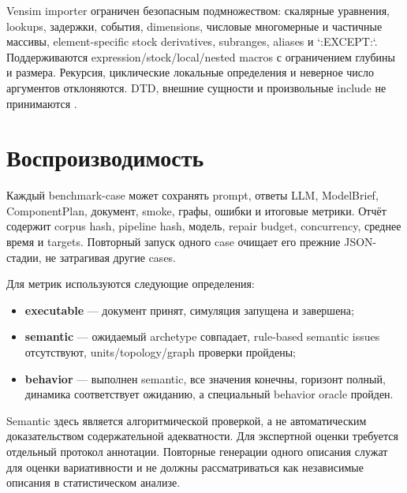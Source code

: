 Vensim importer ограничен безопасным подмножеством: скалярные уравнения, lookups, задержки, события, dimensions, числовые многомерные и частичные массивы, element-specific stock derivatives, subranges, aliases и `:EXCEPT:`. Поддерживаются expression/stock/local/nested macros с ограничением глубины и размера. Рекурсия, циклические локальные определения и неверное число аргументов отклоняются. DTD, внешние сущности и произвольные include не принимаются \cite{vensim2024,xmile2015}.

\section{Воспроизводимость}

Каждый benchmark-case может сохранять prompt, ответы LLM, ModelBrief, ComponentPlan, документ, smoke, графы, ошибки и итоговые метрики. Отчёт содержит corpus hash, pipeline hash, модель, repair budget, concurrency, среднее время и targets. Повторный запуск одного case очищает его прежние JSON-стадии, не затрагивая другие cases.

Для метрик используются следующие определения:

\begin{itemize}
    \item \textbf{executable} --- документ принят, симуляция запущена и завершена;
    \item \textbf{semantic} --- ожидаемый archetype совпадает, rule-based semantic issues отсутствуют, units/topology/graph проверки пройдены;
    \item \textbf{behavior} --- выполнен semantic, все значения конечны, горизонт полный, динамика соответствует ожиданию, а специальный behavior oracle пройден.
\end{itemize}

Semantic здесь является алгоритмической проверкой, а не автоматическим доказательством содержательной адекватности. Для экспертной оценки требуется отдельный протокол аннотации. Повторные генерации одного описания служат для оценки вариативности и не должны рассматриваться как независимые описания в статистическом анализе.

